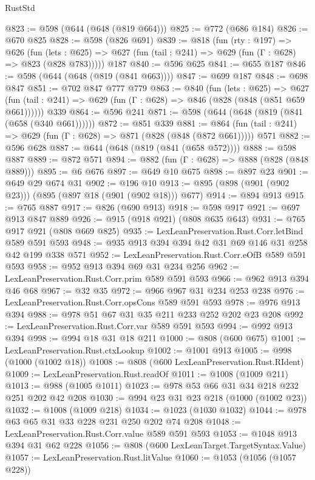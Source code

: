 \begin{lexlean}{RustStd}
\begin{coremodule}
@823 := @598 (@644 (@648 (@819 @664)))
@825 := @772 (@686 @184)
@826 := @670 @825
@828 := @598 (@826 @691)
@839 := @818
    (fun (rty : @197) =>
    @626
      (fun (lets : @625) => @627 (fun (tail : @241) => @629 (fun (Γ : @628) => @823 (@828 @783)))))
    @187
@840 := @596 @625
@841 := @655 @187
@846 := @598 (@644 (@648 (@819 (@841 @663))))
@847 := @699 @187
@848 := @698 @847
@851 := @702 @847 @777 @779
@863 := @840
    (fun (lets : @625) =>
    @627 (fun (tail : @241) => @629 (fun (Γ : @628) => @846 (@828 (@848 (@851 @659 @661))))))
    @339
@864 := @596 @241
@871 := @598 (@644 (@648 (@819 (@841 (@658 (@340 @661))))))
@872 := @851 @339
@881 := @864 (fun (tail : @241) => @629 (fun (Γ : @628) => @871 (@828 (@848 (@872 @661))))) @571
@882 := @596 @628
@887 := @644 (@648 (@819 (@841 (@658 @572))))
@888 := @598 @887
@889 := @872 @571
@894 := @882 (fun (Γ : @628) => @888 (@828 (@848 @889)))
@895 := @6 @676
@897 := @649 @10 @675
@898 := @897 @23
@901 := @649 @29 @674 @31
@902 := @196 @10
@913 := @895 (@898 (@901 (@902 @23))) (@895 (@897 @18 (@901 (@902 @18))) @677)
@914 := @894 @913
@915 := @765 @887
@917 := @826 (@690 @913)
@918 := @598 @917
@921 := @697 @913 @847 @889
@926 := @915 (@918 @921) (@808 @635 @643)
@931 := @765 @917 @921 (@808 @669 @825)
@935 := LexLeanPreservation.Rust.Corr.letBind @589 @591 @593
@948 := @935 @913 @394 @394 @42 @31 @69 @146 @31 @258 @42 @199 @338 @571
@952 := LexLeanPreservation.Rust.Corr.eOfB @589 @591 @593
@958 := @952 @913 @394 @69 @31 @234 @256
@962 := LexLeanPreservation.Rust.Corr.prim @589 @591 @593
@966 := @962 @913 @394 @46 @68
@967 := @32 @35
@972 := @966 @967 @31 @234 @253 @238
@976 := LexLeanPreservation.Rust.Corr.opsCons @589 @591 @593
@978 := @976 @913 @394
@988 := @978 @51 @67 @31 @35 @211 @233 @252 @202 @23 @208
@992 := LexLeanPreservation.Rust.Corr.var @589 @591 @593
@994 := @992 @913 @394
@998 := @994 @18 @31 @18 @211
@1000 := @808 (@600 @675)
@1001 := LexLeanPreservation.Rust.ctxLookup
@1002 := @1001 @913
@1005 := @998 (@1000 (@1002 @18))
@1008 := @808 (@600 LexLeanPreservation.Rust.RIdent)
@1009 := LexLeanPreservation.Rust.readOf
@1011 := @1008 (@1009 @211)
@1013 := @988 (@1005 @1011)
@1023 := @978 @53 @66 @31 @34 @218 @232 @251 @202 @42 @208
@1030 := @994 @23 @31 @23 @218 (@1000 (@1002 @23))
@1032 := @1008 (@1009 @218)
@1034 := @1023 (@1030 @1032)
@1044 := @978 @63 @65 @31 @33 @228 @231 @250 @202 @74 @208
@1048 := LexLeanPreservation.Rust.Corr.value @589 @591 @593
@1053 := @1048 @913 @394 @31 @62 @228
@1056 := @808 (@600 LexLeanTarget.TargetSyntax.Value)
@1057 := LexLeanPreservation.Rust.litValue
@1060 := @1053 (@1056 (@1057 @228))

\end{coremodule}
\end{lexlean}
